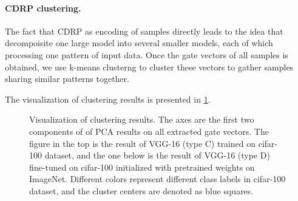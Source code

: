 \documentclass[sigplan,10pt,review]{acmart}\settopmatter{printfolios=true,printccs=false,printacmref=false}
\begin{document}
\paragraph{CDRP clustering.}

The fact that CDRP as encoding of samples directly leads to the idea that decompoisite one large model into several smaller models, each of which processing one pattern of input data. Once the gate vectors of all samples is obtained, we use k-means clusterng to cluster these vectors to gather samples sharing similar patterns together.

The visualization of clustering results is presented in \cref{fig:vgg-cluster-pca}.

\begin{figure}
	\centering
    \caption{Visualization of clustering results. The axes are the first two components of of PCA results on all extracted gate vectors. The figure in the top is the result of VGG-16 (type C) trained on cifar-100 dataset, and the one below is the result of VGG-16 (type D) fine-tuned on cifar-100 initialized with pretrained weights on ImageNet. Different colors represent different class labels in cifar-100 dataset, and the cluster centers are denoted as blue squares.}
    \label{fig:vgg-cluster-pca}
\end{figure}
\end{document}
